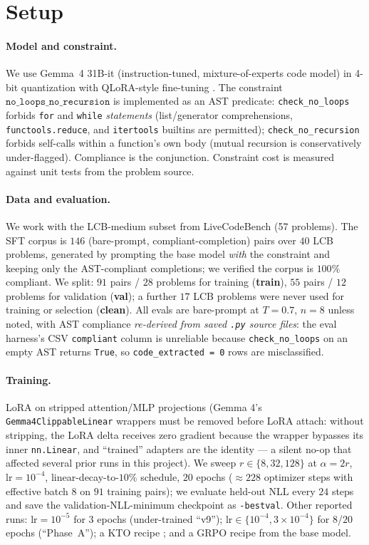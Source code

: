 \documentclass[11pt]{article}
\newcommand{\nlnr}{\texttt{no\_loops\_no\_recursion}}
\newcommand{\codecheck}[1]{\texttt{check\_#1}}
\begin{document}
\section{Setup}
\label{sec:setup}

\paragraph{Model and constraint.}
We use Gemma~4 31B-it (instruction-tuned, mixture-of-experts code model) in 4-bit quantization with QLoRA-style fine-tuning \citep{dettmers2024qlora, hu2022lora}. The constraint $\nlnr$ is implemented as an AST predicate: \codecheck{no\_loops} forbids \texttt{for} and \texttt{while} \emph{statements} (list/generator comprehensions, \texttt{functools.reduce}, and \texttt{itertools} builtins are permitted); \codecheck{no\_recursion} forbids self-calls within a function's own body (mutual recursion is conservatively under-flagged). Compliance is the conjunction. Constraint cost is measured against unit tests from the problem source.

\paragraph{Data and evaluation.}
We work with the LCB-medium subset from LiveCodeBench (57 problems). The SFT corpus is $146$ (bare-prompt, compliant-completion) pairs over $40$ LCB problems, generated by prompting the base model \emph{with} the constraint and keeping only the AST-compliant completions; we verified the corpus is $100\%$ compliant. We split: $91$ pairs / $28$ problems for training (\textbf{train}), $55$ pairs / $12$ problems for validation (\textbf{val}); a further $17$ LCB problems were never used for training or selection (\textbf{clean}). All evals are bare-prompt at $T=0.7$, $n=8$ unless noted, with AST compliance \emph{re-derived from saved \texttt{.py} source files}: the eval harness's CSV \texttt{compliant} column is unreliable because \codecheck{no\_loops} on an empty AST returns \texttt{True}, so \texttt{code\_extracted = 0} rows are misclassified.

\paragraph{Training.}
LoRA on stripped attention/MLP projections (Gemma 4's \texttt{Gemma4ClippableLinear} wrappers must be removed before LoRA attach: without stripping, the LoRA delta receives zero gradient because the wrapper bypasses its inner \texttt{nn.Linear}, and ``trained'' adapters are the identity --- a silent no-op that affected several prior runs in this project). We sweep $r \in \{8, 32, 128\}$ at $\alpha = 2r$, $\text{lr} = 10^{-4}$, linear-decay-to-$10\%$ schedule, $20$ epochs ($\approx 228$ optimizer steps with effective batch $8$ on $91$ training pairs); we evaluate held-out NLL every $24$ steps and save the validation-NLL-minimum checkpoint as \texttt{-bestval}. Other reported runs: $\text{lr} = 10^{-5}$ for $3$ epochs (under-trained ``v9''); $\text{lr} \in \{10^{-4}, 3\!\times\!10^{-4}\}$ for $8$/$20$ epochs (``Phase~A''); a KTO recipe \citep{ethayarajh2024kto}; and a GRPO recipe \citep{shao2024deepseekmath} from the base model.
\end{document}

